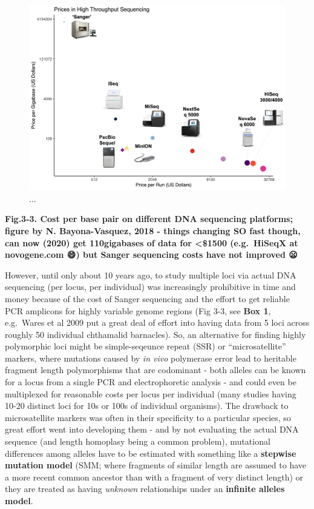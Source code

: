\documentclass[
]{article}
\begin{document}
\begin{figure}

{\centering \includegraphics[width=0.9\linewidth]{MEImages/BayonaPicture2} 

}

\caption{...}\label{fig:unnamed-chunk-4}
\end{figure}

\textbf{Fig.3-3. Cost per base pair on different DNA sequencing
platforms; figure by N. Bayona-Vasquez, 2018 - things changing SO fast
though, can now (2020) get 110gigabases of data for \textless\$1500
(e.g.~HiSeqX at novogene.com 😄) but Sanger sequencing costs have not
improved 😦 }

However, until only about 10 years ago, to study multiple loci via
actual DNA sequencing (per locus, per individual) was increasingly
prohibitive in time and money because of the cost of Sanger sequencing
and the effort to get reliable PCR amplicons for highly variable genome
regions (Fig 3-3, see \textbf{Box 1}, e.g.~Wares et al 2009 put a great
deal of effort into having data from 5 loci across roughly 50 individual
chthamalid barnacles). So, an alternative for finding highly polymorphic
loci might be simple-seqeunce repeat (SSR) or ``microsatellite''
markers, where mutations caused by \emph{in vivo} polymerase error lead
to heritable fragment length polymorphisms that are codominant - both
alleles can be known for a locus from a single PCR and electrophoretic
analysis - and could even be multiplexed for reasonable costs per locus
per individual (many studies having 10-20 distinct loci for 10s or 100s
of individual organisms). The drawback to microsatellite markers was
often in their specificity to a particular species, so great effort went
into developing them - and by not evaluating the actual DNA sequence
(and length homoplasy being a common problem), mutational differences
among alleles have to be estimated with something like a
\textbf{stepwise mutation model} (SMM; where fragments of similar length
are assumed to have a more recent common ancestor than with a fragment
of very distinct length) or they are treated as having \emph{unknown}
relationships under an \textbf{infinite alleles model}.
\end{document}
